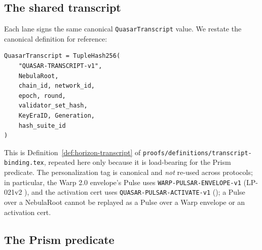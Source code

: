 \subsection{The shared transcript}

Each lane signs the same canonical \texttt{QuasarTranscript} value. We restate the canonical definition for reference:

\begin{verbatim}
QuasarTranscript = TupleHash256(
    "QUASAR-TRANSCRIPT-v1",
    NebulaRoot,
    chain_id, network_id,
    epoch, round,
    validator_set_hash,
    KeyEraID, Generation,
    hash_suite_id
)
\end{verbatim}

This is Definition~\ref{def:horizon-transcript} of \texttt{proofs/definitions/transcript-binding.tex}, repeated here only because it is load-bearing for the Prism predicate. The personalization tag is canonical and \emph{not} re-used across protocols; in particular, the Warp 2.0 envelope's Pulse uses \texttt{WARP-PULSAR-ENVELOPE-v1} (LP-021v2 \cite{lp021v2,luxwarpv2}), and the activation cert uses \texttt{QUASAR-PULSAR-ACTIVATE-v1} (\cite{luxpulsar}); a Pulse over a NebulaRoot cannot be replayed as a Pulse over a Warp envelope or an activation cert.

\subsection{The Prism predicate}

